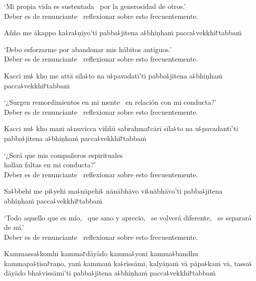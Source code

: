 \begin{english}
  `Mi propia vida es sustentada \pause\ por la generosidad de otros.' \pause\\
  Deber es de renunciante \pause\ reflexionar sobre esto frecuentemente.
\end{english}

Añño me ākappo ka꜕ra꜕ṇīyo'ti pabba꜕jitena a꜕bhiṇhaṁ pacca꜕vekkhi꜓tabbaṁ

\begin{english}
  `Debo esforzarme por abandonar mis hábitos antiguos.' \pause\\
  Deber es de renunciante \pause\ reflexionar sobre esto frecuentemente.
\end{english}

\clearpage

Kacci nu꜕ kho me attā sīla꜕to na u꜕pavadatī'ti pabba꜕jitena a꜕bhiṇhaṁ pacca꜕vekkhi꜓tabbaṁ

\begin{english}
  `¿Surgen remordimientos en mi mente \pause\ en relación con mi conducta?' \pause\\
  Deber es de renunciante \pause\ reflexionar sobre esto frecuentemente.
\end{english}

Kacci nu꜕ kho maṁ a꜕nuvicca viññū sabrahma꜓cārī sīla꜕to na u꜕pavadantī'ti pabba꜕jitena a꜕bhiṇhaṁ pacca꜕vekkhi꜓tabbaṁ

\begin{english}
  `¿Será que mis compañeros espirituales \pause\\
  hallan faltas en mi conducta?' \pause\\
  Deber es de renunciante \pause\ reflexionar sobre esto frecuentemente.
\end{english}

Sa꜕bbehi me pi꜕yehi ma꜕nāpehi꜕ nānābhāvo vi꜕nābhāvo'ti pabba꜕jitena abhiṇhaṁ pacca꜕vekkhi꜓tabbaṁ

\begin{english}
  `Todo aquello que es mío, \pause\ que amo y aprecio, \pause\ se volverá diferente, \pause\ se separará de mí.' \pause\\
  Deber es de renunciante \pause\ reflexionar sobre esto frecuentemente.
\end{english}

Kammassa꜕komhi kamma꜓dāyādo kamma꜕yoni kamma꜕bandhu kammapa꜕ṭisa꜓raṇo, yaṁ kammaṁ ka꜕rissāmi, kalyāṇaṁ vā pāpa꜕kaṁ vā, tassa꜕ dāyādo bha꜕vissāmī'ti pabba꜕jitena a꜕bhiṇhaṁ pacca꜕vekkhi꜓tabbaṁ

